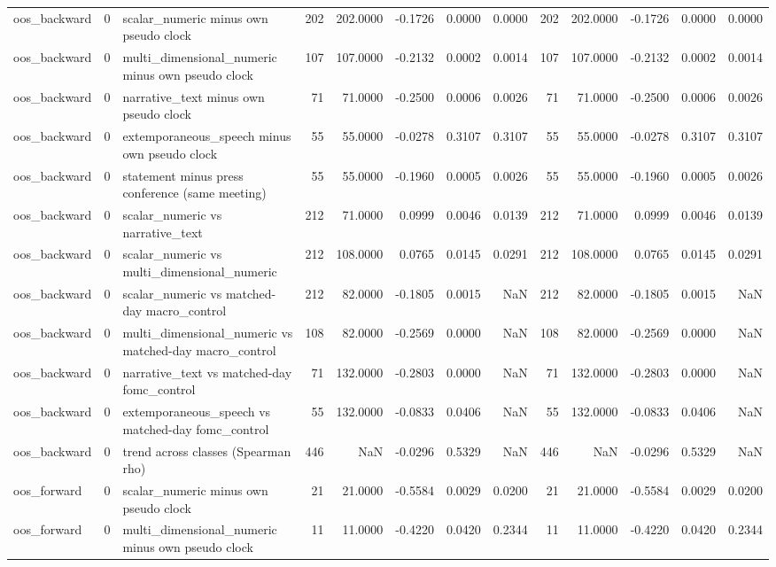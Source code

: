 \begin{tabular}{lrlrrrrrrrrrr}
oos_backward & 0 & scalar_numeric minus own pseudo clock & 202 & 202.0000 & -0.1726 & 0.0000 & 0.0000 & 202 & 202.0000 & -0.1726 & 0.0000 & 0.0000 \\
oos_backward & 0 & multi_dimensional_numeric minus own pseudo clock & 107 & 107.0000 & -0.2132 & 0.0002 & 0.0014 & 107 & 107.0000 & -0.2132 & 0.0002 & 0.0014 \\
oos_backward & 0 & narrative_text minus own pseudo clock & 71 & 71.0000 & -0.2500 & 0.0006 & 0.0026 & 71 & 71.0000 & -0.2500 & 0.0006 & 0.0026 \\
oos_backward & 0 & extemporaneous_speech minus own pseudo clock & 55 & 55.0000 & -0.0278 & 0.3107 & 0.3107 & 55 & 55.0000 & -0.0278 & 0.3107 & 0.3107 \\
oos_backward & 0 & statement minus press conference (same meeting) & 55 & 55.0000 & -0.1960 & 0.0005 & 0.0026 & 55 & 55.0000 & -0.1960 & 0.0005 & 0.0026 \\
oos_backward & 0 & scalar_numeric vs narrative_text & 212 & 71.0000 & 0.0999 & 0.0046 & 0.0139 & 212 & 71.0000 & 0.0999 & 0.0046 & 0.0139 \\
oos_backward & 0 & scalar_numeric vs multi_dimensional_numeric & 212 & 108.0000 & 0.0765 & 0.0145 & 0.0291 & 212 & 108.0000 & 0.0765 & 0.0145 & 0.0291 \\
oos_backward & 0 & scalar_numeric vs matched-day macro_control & 212 & 82.0000 & -0.1805 & 0.0015 & NaN & 212 & 82.0000 & -0.1805 & 0.0015 & NaN \\
oos_backward & 0 & multi_dimensional_numeric vs matched-day macro_control & 108 & 82.0000 & -0.2569 & 0.0000 & NaN & 108 & 82.0000 & -0.2569 & 0.0000 & NaN \\
oos_backward & 0 & narrative_text vs matched-day fomc_control & 71 & 132.0000 & -0.2803 & 0.0000 & NaN & 71 & 132.0000 & -0.2803 & 0.0000 & NaN \\
oos_backward & 0 & extemporaneous_speech vs matched-day fomc_control & 55 & 132.0000 & -0.0833 & 0.0406 & NaN & 55 & 132.0000 & -0.0833 & 0.0406 & NaN \\
oos_backward & 0 & trend across classes (Spearman rho) & 446 & NaN & -0.0296 & 0.5329 & NaN & 446 & NaN & -0.0296 & 0.5329 & NaN \\
oos_forward & 0 & scalar_numeric minus own pseudo clock & 21 & 21.0000 & -0.5584 & 0.0029 & 0.0200 & 21 & 21.0000 & -0.5584 & 0.0029 & 0.0200 \\
oos_forward & 0 & multi_dimensional_numeric minus own pseudo clock & 11 & 11.0000 & -0.4220 & 0.0420 & 0.2344 & 11 & 11.0000 & -0.4220 & 0.0420 & 0.2344 \\

\end{tabular}
